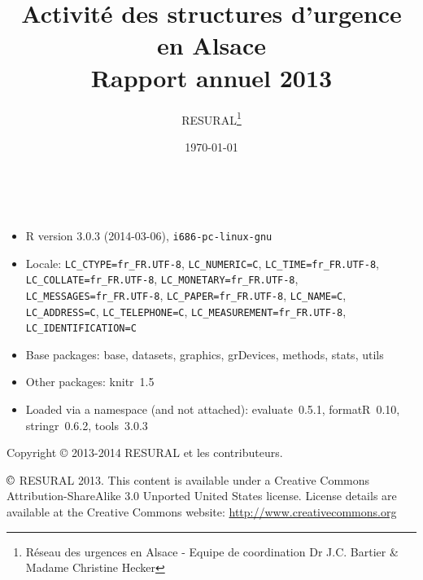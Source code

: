 \documentclass[12pt,english,french,twoside]{book}\usepackage[]{graphicx}\usepackage[]{color}
\begin{document}


\frontmatter

\title{Activité des structures d'urgence en Alsace \\Rapport annuel 2013}
\author{RESURAL\thanks{Réseau des urgences en Alsace - Equipe de coordination Dr J.C.
Bartier \& Madame Christine Hecker}}
\date{\today}
\maketitle


%

\newpage
~\vfill

\begin{itemize}\raggedright
  \item R version 3.0.3 (2014-03-06), \verb|i686-pc-linux-gnu|
  \item Locale: \verb|LC_CTYPE=fr_FR.UTF-8|, \verb|LC_NUMERIC=C|, \verb|LC_TIME=fr_FR.UTF-8|, \verb|LC_COLLATE=fr_FR.UTF-8|, \verb|LC_MONETARY=fr_FR.UTF-8|, \verb|LC_MESSAGES=fr_FR.UTF-8|, \verb|LC_PAPER=fr_FR.UTF-8|, \verb|LC_NAME=C|, \verb|LC_ADDRESS=C|, \verb|LC_TELEPHONE=C|, \verb|LC_MEASUREMENT=fr_FR.UTF-8|, \verb|LC_IDENTIFICATION=C|
  \item Base packages: base, datasets, graphics, grDevices,
    methods, stats, utils
  \item Other packages: knitr~1.5
  \item Loaded via a namespace (and not attached): evaluate~0.5.1,
    formatR~0.10, stringr~0.6.2, tools~3.0.3
\end{itemize}



Copyright \copyright{} 2013-2014 RESURAL et les contributeurs.

\noindent $\copyright$ RESURAL 2013. This content is available under a Creative Commons Attribution-ShareAlike 3.0 Unported United States license. License details are available at the Creative Commons website: \url{http://www.creativecommons.org} \\
\end{document}
